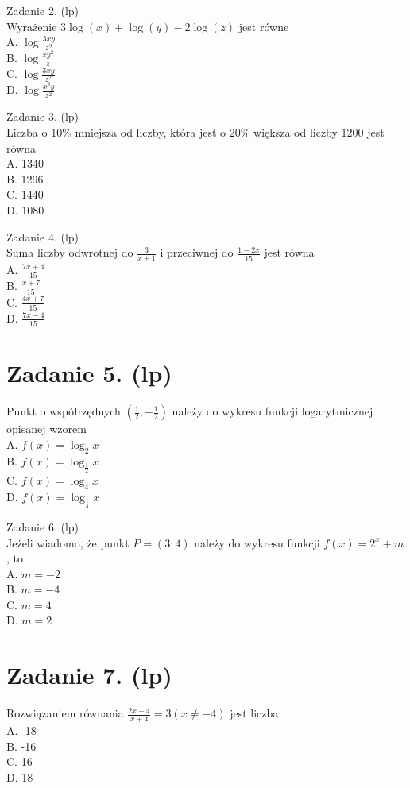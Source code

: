 \documentclass[10pt]{article}
\begin{document}
Zadanie 2. (lp)\\
Wyrażenie \(3 \log (x)+\log (y)-2 \log (z)\) jest równe\\
A. \(\log \frac{3 x y}{z^{2}}\)\\
B. \(\log \frac{x y^{2}}{z}\)\\
C. \(\log \frac{3 x y}{z^{2}}\)\\
D. \(\log \frac{x^{3} y}{z^{2}}\)

Zadanie 3. (lp)\\
Liczba o 10\% mniejsza od liczby, która jest o 20\% większa od liczby 1200 jest równa\\
A. 1340\\
B. 1296\\
C. 1440\\
D. 1080

Zadanie 4. (lp)\\
Suma liczby odwrotnej do \(\frac{3}{x+1}\) i przeciwnej do \(\frac{1-2 x}{15}\) jest równa\\
A. \(\frac{7 x+4}{15}\)\\
B. \(\frac{x+7}{15}\)\\
C. \(\frac{4 x+7}{15}\)\\
D. \(\frac{7 x-4}{15}\)

\section*{Zadanie 5. (lp)}
Punkt o współrzędnych \(\left(\frac{1}{2} ;-\frac{1}{2}\right)\) należy do wykresu funkcji logarytmicznej opisanej wzorem\\
A. \(f(x)=\log _{2} x\)\\
B. \(f(x)=\log _{\frac{1}{2}} x\)\\
C. \(f(x)=\log _{4} x\)\\
D. \(f(x)=\log _{\frac{1}{4}} x\)

Zadanie 6. (lp)\\
Jeżeli wiadomo, że punkt \(P=(3 ; 4)\) należy do wykresu funkcji \(f(x)=2^{x}+m\), to\\
A. \(m=-2\)\\
B. \(m=-4\)\\
C. \(m=4\)\\
D. \(m=2\)

\section*{Zadanie 7. (lp)}
Rozwiązaniem równania \(\frac{2 x-4}{x+4}=3(x \neq-4)\) jest liczba\\
A. -18\\
B. -16\\
C. 16\\
D. 18
\end{document}
